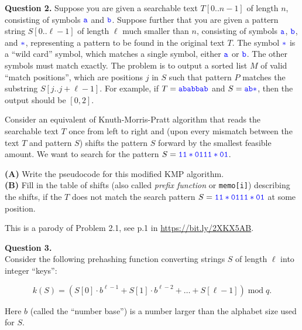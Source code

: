 \documentclass[jou]{apa6}
\begin{document}
\vspace{10pt}
{\bf Question 2.}
Suppose you are given a searchable text $T[0..n-1]$ of length $n$, consisting of symbols 
$\textcolor{blue}{\mathtt{a}}$ and $\textcolor{blue}{\mathtt{b}}$.
Suppose further that you are given a pattern string $S[0..\ell-1]$ of length $\ell$ much smaller than $n$, consisting of
symbols $\textcolor{blue}{\mathtt{a}}$, $\textcolor{blue}{\mathtt{b}}$, and $\textcolor{blue}{\mathtt{\ast}}$, 
representing a pattern to be found in the original text $T$. The symbol $\textcolor{blue}{\mathtt{\ast}}$ is a ``wild card''
symbol, which matches a single symbol, either $\textcolor{blue}{\mathtt{a}}$ or 
$\textcolor{blue}{\mathtt{b}}$. The other symbols must match exactly.
The problem is to output a sorted list $M$ of valid ``match positions'', which are positions $j$ in $S$
such that pattern $P$ matches the substring $S[j..j+\ell-1]$. For example, if $T =\textcolor{blue}{\mathtt{ababbab}}$ and
$S=\textcolor{blue}{\mathtt{ab\ast}}$, then the output should be $[0,2]$.

Consider an equivalent of Knuth-Morris-Pratt algorithm that reads the searchable text $T$ once from left to right
and (upon every mismatch between the text $T$ and pattern $S$) shifts the pattern $S$ forward by the smallest
feasible amount.
We want to search for the pattern $S = \textcolor{blue}{\mathtt{11\ast0111\ast01}}$.

{\bf (A)} Write the pseudocode for this modified KMP algorithm.\\
{\bf (B)} Fill in the table of shifts (also called {\em prefix function} or {\tt memo[i]}) describing the shifts, 
if the $T$ does not match the search pattern $S = \textcolor{blue}{\mathtt{11\ast0111\ast01}}$ at some position.

This is a parody of Problem 2.1, see p.1 in \url{https://bit.ly/2XKX5AB}.






\vspace{10pt}
{\bf Question 3.}\\
Consider the following prehashing function converting strings $S$ of length $\ell$
into integer ``keys'': 

{\footnotesize
\begin{equation}
\label{eq:prehashing}
k(S) = \left(S[0]\cdot{}b^{\ell-1} + S[1] \cdot b^{\ell-2} + \ldots + S[\ell - 1]\right)\;\text{mod}\;q.
\end{equation}} 

\noindent
Here $b$ (called the ``number base'') is a number larger than the alphabet size used for $S$. 
\end{document}
